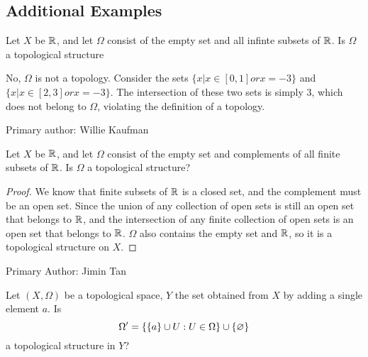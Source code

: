\subsection{Additional Examples}

\begin{minorEx} %
  Let $X$ be $\mathbb{R}$, and let $\Omega$ consist of the empty set and
  all infinte subsets of $\mathbb{R}$. Is $\Omega$ a topological structure
\end{minorEx}

No, $\Omega$ is not a topology. Consider the sets $\{x | x \in [0, 1] or x = -3\}$ and $\{x | x \in [2, 3] or x = -3\}$. The intersection of these two sets is simply {3}, which does not belong to $\Omega$, violating the definition of a topology.

Primary author: Willie Kaufman

\begin{minorEx} %
  Let $X$ be $\mathbb{R}$, and let $\Omega$ consist of the empty set and
  complements of all finite subsets of $\mathbb{R}$. Is $\Omega$ a topological structure?
\end{minorEx}

\begin{proof}
We know that finite subsets of $\mathbb{R}$ is a closed set, and the complement must be an open set. Since the union of any collection of open sets is still an open set that belongs to $\mathbb{R}$, and the intersection of any finite collection of open sets is an open set that belongs to $\mathbb{R}$. $\Omega$ also contains the empty set and $\mathbb{R}$, so it is a topological structure on $X$.
\end{proof}

Primary Author: Jimin Tan

\begin{minorEx} %
    Let $(X, \Omega)$ be a topological space, $Y$ the set obtained from $X$ by
    adding a single element $a$. Is
    \[
        \Omega' = \{\{a\} \cup U : U \in \Omega\} \cup \{\varnothing\}
    \]
    a topological structure in $Y$?
\end{minorEx}

